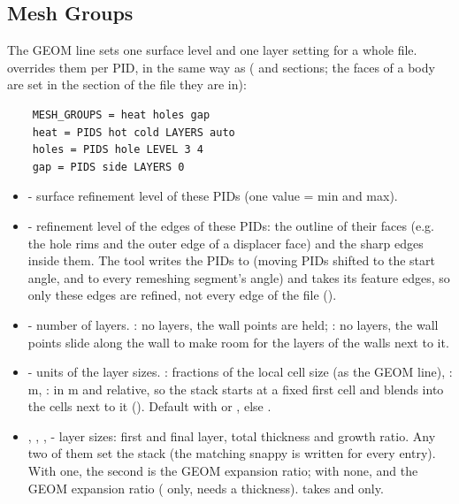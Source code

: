 \subsection{Mesh Groups}
The GEOM line sets one surface level and one layer setting for a whole file.  overrides them per PID, in the same way as  ( and  sections; the faces of a  body are set in the section of the file they are in):
\begin{lstlisting}
    MESH_GROUPS = heat holes gap
    heat = PIDS hot cold LAYERS auto
    holes = PIDS hole LEVEL 3 4
    gap = PIDS side LAYERS 0
\end{lstlisting}
\begin{itemize}
    \item {} - surface refinement level of these PIDs (one value = min and max).
    \item {} - refinement level of the edges of these PIDs: the outline of their faces (e.g. the hole rims and the outer edge of a displacer face) and the sharp edges inside them. The tool writes the PIDs to  (moving PIDs shifted to the start angle, and to every remeshing segment's angle) and  takes its feature edges, so only these edges are refined, not every edge of the file ().
    \item {} - number of layers. : no layers, the wall points are held; : no layers, the wall points slide along the wall to make room for the layers of the walls next to it.
    \item {} - units of the layer sizes. : fractions of the local cell size (as the GEOM line), : m, :  in m and  relative, so the stack starts at a fixed first cell and blends into the cells next to it (). Default  with  or , else .
    \item {}, , ,  - layer sizes: first and final layer, total thickness and growth ratio. Any two of them set the stack (the matching snappy  is written for every entry). With one, the second is the GEOM expansion ratio; with none,  and the GEOM expansion ratio ( only,  needs a thickness).  takes  and  only.

\end{itemize}
